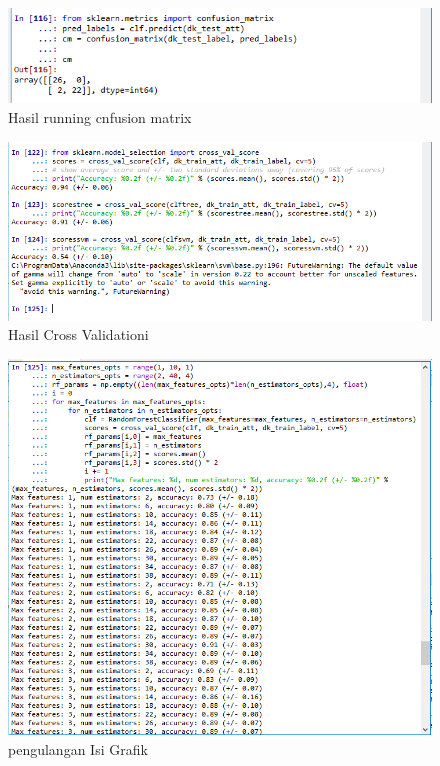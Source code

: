 \begin{figure}
      \centerline{\includegraphics[width=1\textwidth]
      {figures/cokro/c65}}
      \caption{Hasil running cnfusion matrix}
      \label{c65}
      \end{figure}

\begin{figure}
      \centerline{\includegraphics[width=1\textwidth]
      {figures/cokro/c66}}
      \caption{Hasil Cross Validationi}
      \label{c66}
      \end{figure}

\begin{figure}
      \centerline{\includegraphics[width=1\textwidth]
      {figures/cokro/c67}}
      \caption{pengulangan Isi Grafik}
      \label{c67}
      \end{figure}

